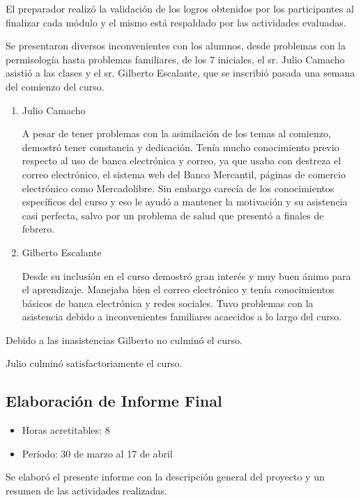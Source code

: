                 El preparador realizó la validación de los logros obtenidos por los participantes al finalizar cada módulo y el mismo está respaldado por las actividades evaluadas.
                
                Se presentaron diversos inconvenientes con los alumnos, desde problemas con la permisología hasta problemas familiares, de los 7 iniciales, el sr. Julio Camacho asistió a las clases y el sr. Gilberto Escalante, que se inscribió pasada una semana del comienzo del curso.
                
                \begin{enumerate}
                    \item Julio Camacho
                    
                    A pesar de tener problemas con la asimilación de los temas al comienzo, demostró tener constancia y dedicación. Tenía mucho conocimiento previo respecto al uso de banca electrónica y correo, ya que usaba con destreza el correo electrónico, el sistema web del Banco Mercantil, páginas de comercio electrónico como Mercadolibre. Sin embargo carecía de los conocimientos específicos del curso y eso le ayudó a mantener la motivación y su asistencia casi perfecta, salvo por un problema de salud que presentó a finales de febrero.
                    
                    \item Gilberto Escalante
                    
                    Desde su inclusión en el curso demostró gran interés y muy buen ánimo para el aprendizaje. Manejaba bien el correo electrónico y tenía conocimientos básicos de banca electrónica y redes sociales. Tuvo problemas con la asistencia debido a inconvenientes familiares acaecidos a lo largo del curso.
                    
                \end{enumerate}
                
                Debido a las inasistencias Gilberto no culminó el curso.
                
                Julio culminó satisfactoriamente el curso.
                
             \subsection {Elaboración de Informe Final}
             \begin{itemize}
                 \item Horas acretitables: 8
                 \item Período: 30 de marzo al 17 de abril
                \end{itemize}
                
                Se elaboró el presente informe con la descripción general del proyecto y un resumen de las actividades realizadas.

	\pagebreak
	
